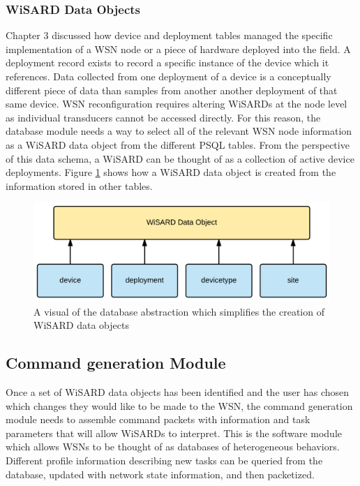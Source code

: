 \subsubsection{WiSARD Data Objects}
Chapter 3 discussed how device and deployment tables managed the specific implementation of a WSN node or a piece of hardware deployed into the field. A deployment record exists to record a specific instance of the device which it references. Data collected from one deployment of a device is a conceptually different piece of data than samples from another another deployment of that same device. WSN reconfiguration requires altering WiSARDs at the node level as individual transducers cannot be accessed directly. For this reason, the database module needs a way to select all of the relevant WSN node information as a WiSARD data object from the different PSQL tables. From the perspective of this data schema, a WiSARD can be thought of as a collection of active device deployments. Figure \ref{fig:wisard_object} shows how a WiSARD data object is created from the information stored in other tables. 

\begin{figure}[H]
	\centering
	\includegraphics[width=\textwidth]{figures/wis_data_objects.png}
	\caption{A visual of the database abstraction which simplifies the creation of WiSARD data objects}
	\label{fig:wisard_object}
\end{figure}

\subsection{Command generation Module}
Once a set of WiSARD data objects has been identified and the user has chosen which changes they would like to be made to the WSN, the command generation module needs to assemble command packets with information and task parameters that will allow WiSARDs to interpret. This is the software module which allows WSNs to be thought of as databases of heterogeneous behaviors. Different profile information describing new tasks can be queried from the database, updated with network state information, and then packetized.\\


